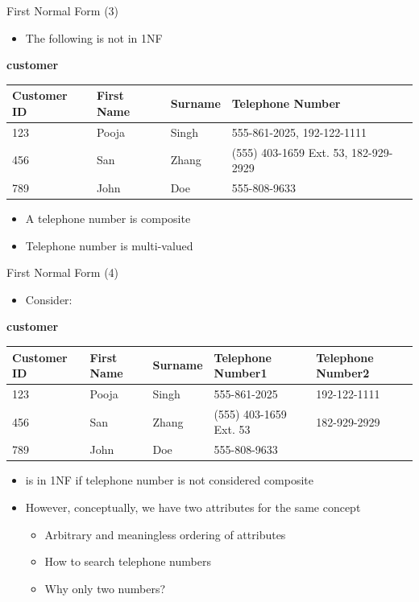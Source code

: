 \documentclass[aspectratio=169, xcolor=dvipsnames]{beamer}
\begin{document}
\begin{frame}{First Normal Form (3)}
    \begin{itemize}
        \item The following is not in 1NF
    \end{itemize}
    \textbf{customer}
    \begin{center}
    \begin{tabular}{|l|l|l|l|}
    \hline
    \textbf{Customer ID} & \textbf{First Name} & \textbf{Surname} & \textbf{Telephone Number} \\ \hline
    123 & Pooja & Singh & 555-861-2025, 192-122-1111 \\ 
    456 & San & Zhang & (555) 403-1659 Ext. 53, 182-929-2929 \\ 
    789 & John & Doe & 555-808-9633 \\ \hline
    \end{tabular}
    \end{center}
    \begin{itemize}[<+->]
        \item A telephone number is composite
        \item Telephone number is multi-valued
    \end{itemize}
\end{frame}

\begin{frame}{First Normal Form (4)}
    \begin{itemize}
        \item Consider:
    \end{itemize}
    \textbf{customer}
    \begin{center}
    \begin{tabular}{|l|l|l|l|l|}
    \hline
    \textbf{Customer ID} & \textbf{First Name} & \textbf{Surname} & \textbf{Telephone Number1} & \textbf{Telephone Number2} \\ \hline
    123 & Pooja & Singh & 555-861-2025 & 192-122-1111 \\ 
    456 & San & Zhang & (555) 403-1659 Ext. 53 & 182-929-2929 \\ 
    789 & John & Doe & 555-808-9633 & \\ \hline
    \end{tabular}
    \end{center}
    \begin{itemize}[<+->]
        \item is in 1NF if telephone number is not considered composite
        \item However, conceptually, we have two attributes for the same concept
        \begin{itemize}
            \item[$\triangleright$] Arbitrary and meaningless ordering of attributes
            \item[$\triangleright$] How to search telephone numbers
            \item[$\triangleright$] Why only two numbers?
        \end{itemize}
    \end{itemize}
\end{frame}
\end{document}
